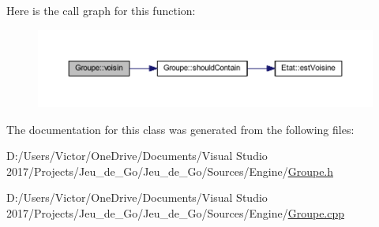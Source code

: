 Here is the call graph for this function\+:\nopagebreak
\begin{figure}[H]
\begin{center}
\leavevmode
\includegraphics[width=350pt]{class_groupe_a13537bf2de72a097dd9ee102d14686d5_cgraph}
\end{center}
\end{figure}


The documentation for this class was generated from the following files\+:\begin{DoxyCompactItemize}
\item 
D\+:/\+Users/\+Victor/\+One\+Drive/\+Documents/\+Visual Studio 2017/\+Projects/\+Jeu\+\_\+de\+\_\+\+Go/\+Jeu\+\_\+de\+\_\+\+Go/\+Sources/\+Engine/\hyperlink{_groupe_8h}{Groupe.\+h}\item 
D\+:/\+Users/\+Victor/\+One\+Drive/\+Documents/\+Visual Studio 2017/\+Projects/\+Jeu\+\_\+de\+\_\+\+Go/\+Jeu\+\_\+de\+\_\+\+Go/\+Sources/\+Engine/\hyperlink{_groupe_8cpp}{Groupe.\+cpp}\end{DoxyCompactItemize}
